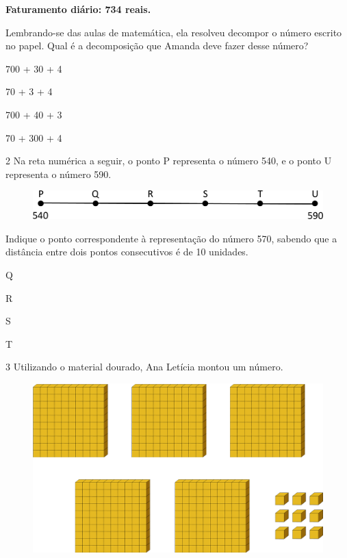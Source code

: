 \begin{myquote}
\begin{center}
\textbf{Faturamento diário: 734 reais.}
\end{center}
\end{myquote}

Lembrando-se das aulas de matemática, ela resolveu decompor o número escrito
no papel. Qual é a decomposição que Amanda deve fazer desse
número?

\begin{escolha}
\item
  700 + 30 + 4
\item
  70 + 3 + 4
\item
  700 + 40 + 3
\item
  70 + 300 + 4
\end{escolha}

\num{2} Na reta numérica a seguir, o ponto P representa o número 540, e o ponto U representa o número 590.

\begin{figure}[htpb!]
\centering
\includegraphics[width=\textwidth]{./media/image8.png}
\end{figure}

Indique o ponto correspondente à representação do número 570, sabendo que a
distância entre dois pontos consecutivos é de 10 unidades.

\begin{escolha}
\item
  Q
\item
  R
\item
  S
\item
  T
\end{escolha}

\pagebreak

\num{3} Utilizando o material dourado, Ana Letícia montou um número.

\begin{figure}[htpb!]
\centering
\includegraphics[width=\textwidth]{./media/image9.png}
\end{figure}

